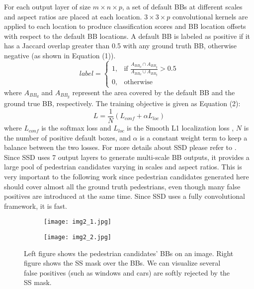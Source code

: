 \documentclass[10pt,letterpaper]{article}
\begin{document}
For each output layer of size $m\times n\times p$, a set of default BBs at different scales and aspect ratios are placed at each location. $3\times 3\times p$ convolutional kernels are applied to each location to produce classification scores and BB location offsets with respect to the default BB locations. A default BB is labeled as positive if it has a Jaccard overlap greater than 0.5 with any ground truth BB, otherwise negative (as shown in Equation (1)).  
\begin{equation} \label{}
    label=
\begin{cases}
    1,& \text{if } \frac{A_{BB_{d}}\cap A_{BB_{g}}}{A_{BB_{d}}\cup A_{BB_{g}}}>0.5 \\ 
    0,& \text{otherwise}
\end{cases}
\end{equation}
where $A_{BB_{d}}$ and $A_{BB_{g}}$ represent the area covered by the default BB and the ground true BB, respectively. The training objective is given as Equation (2):
\begin{equation}
L=\frac{1}{N}(L_{conf}+\alpha L_{loc})
\end{equation}
where $L_{conf}$ is the softmax loss and $L_{loc}$ is the Smooth L1 localization loss \cite{fastrcnn}, $N$ is the number of positive default boxes, and $\alpha$ is a constant weight term to keep a balance between the two losses. For more details about SSD please refer to \cite{SSD}. Since SSD uses 7 output layers to generate multi-scale BB outputs, it provides a large pool of pedestrian candidates varying in scales and aspect ratios. This is very important to the following work since pedestrian candidates generated here should cover almost all the ground truth pedestrians, even though many false positives are introduced at the same time. Since SSD uses a fully convolutional framework, it is fast.

\begin{figure*}
\begin{subfigure}{.5\textwidth}
  \centering
  \texttt{[image: img2\_1.jpg]}
  \label{fig:sfig1}
\end{subfigure}
\begin{subfigure}{.5\textwidth}
  \centering
  \texttt{[image: img2\_2.jpg]}
  \label{fig:sfig2}
\end{subfigure}
\caption{Left figure shows the pedestrian candidates' BBs on an image. Right figure shows the SS mask over the BBs. We can visualize several false positives (such as windows and cars) are softly rejected by the SS mask.}
\label{fig:fig}
\end{figure*}
\end{document}

